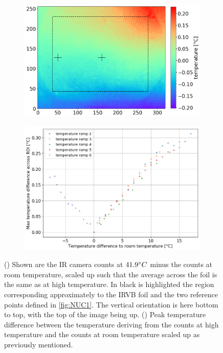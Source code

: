 \begin{figure}
     \centering
     \begin{subfigure}{0.7\linewidth}
         \centering
         \includegraphics[trim={0 0 0 0},clip,width=\linewidth]{Chapters/chapter2/figs/NUC_calib6.png}
         \caption{}
         \label{NUC_calib6}
     \end{subfigure}
     \begin{subfigure}{0.7\linewidth}
         \centering
         \includegraphics[trim={0 0 5 0},clip,width=\linewidth]{Chapters/chapter2/figs/NUC_calib5.png}
         \caption{}
         \label{NUC_calib5}
     \end{subfigure}
    \caption{() Shown are the IR camera counts at $41.9\degree C$ minus the counts at room temperature, scaled up such that the average across the foil is the same as at high temperature. In black is highlighted the region corresponding approximately to the IRVB foil and the two reference points defined in \autoref{fig:NUC1}. The vertical orientation is here bottom to top, with the top of the image being up. () Peak temperature difference between the temperature deriving from the counts at high temperature and the counts at room temperature scaled up as previously mentioned.}
    \label{fig:NUC2}
\end{figure}

